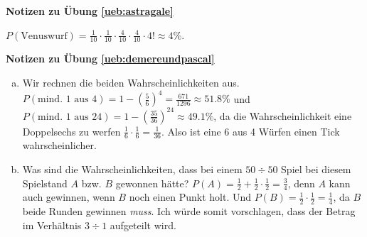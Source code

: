 \documentclass[%
<<<<<<< Updated upstream
<<<<<<< Updated upstream
11pt,%
twoside,%
titlepage,%
german,%
=======
=======
>>>>>>> Stashed changes
11pt,%
twoside,%
titlepage,%
swissgerman,%
<<<<<<< Updated upstream
>>>>>>> Stashed changes
=======
>>>>>>> Stashed changes
headsepline%
]{scrartcl}
\newcommand{\faReturnGray}{\textcolor{gray}{\faMailReply}} %
\theoremstyle{definition}
\theoremstyle{plain}
\newcommand{\concatueb}[1]{ueb:#1}%
\newcommand{\concatlsg}[1]{lsg:#1}%
\newenvironment{lsg}[1]{%
    \par\noindent\textbf{Notizen zu Übung \ref{\concatueb{#1}}}\label{\concatlsg{#1}}
    \hfill\hyperref[\concatueb{#1}]{\faReturnGray}\par %
}{%
    \par%
}
\newcommand{\concatueb}[1]{ueb:#1}%
\newcommand{\concatlsg}[1]{lsg:#1}%
\newenvironment{lsg}[1]{%
    \par\noindent\textbf{Notizen zu Übung \ref{\concatueb{#1}}.}%
    \label{\concatlsg{#1}}
}{%
    \par%
}
\begin{document}
 
 \begin{lsg}{astragale}
$P(\text{Venuswurf})=\frac{1}{10}\cdot\frac{1}{10}\cdot\frac{4}{10}\cdot\frac{4}{10}\cdot4!\approx4\%$.
 \end{lsg}


\begin{lsg}{demereundpascal}
\begin{enumerate}[a)]
\item Wir rechnen die beiden Wahrscheinlichkeiten aus. $P(\text{mind. 1 aus 4})=1-\left(\frac{5}{6}\right)^{4}=\frac{671}{1296}\approx51.8\%$ und $P(\text{mind. 1 aus 24})=1-\left(\frac{35}{36}\right)^{24}\approx49.1\%$, da die Wahrscheinlichkeit eine Doppelsechs zu werfen $\frac{1}{6}\cdot\frac{1}{6}=\frac{1}{36}$. Also ist eine 6 aus 4 W\"urfen einen Tick wahrscheinlicher.
\item Was sind die Wahrscheinlichkeiten, dass bei einem $50\div50$ Spiel bei diesem Spielstand $A$ bzw. $B$ gewonnen h\"atte? $P(A)=\frac{1}{2}+\frac{1}{2}\cdot\frac{1}{2}=\frac{3}{4}$, denn $A$ kann auch gewinnen, wenn $B$ noch einen Punkt holt. Und $P(B)=\frac{1}{2}\cdot\frac{1}{2}=\frac{1}{4}$, da $B$ beide Runden gewinnen \emph{muss}. Ich w\"urde somit vorschlagen, dass der Betrag im Verh\"altnis $3\div1$ aufgeteilt wird.
\end{enumerate}
\end{lsg}
\end{document}
